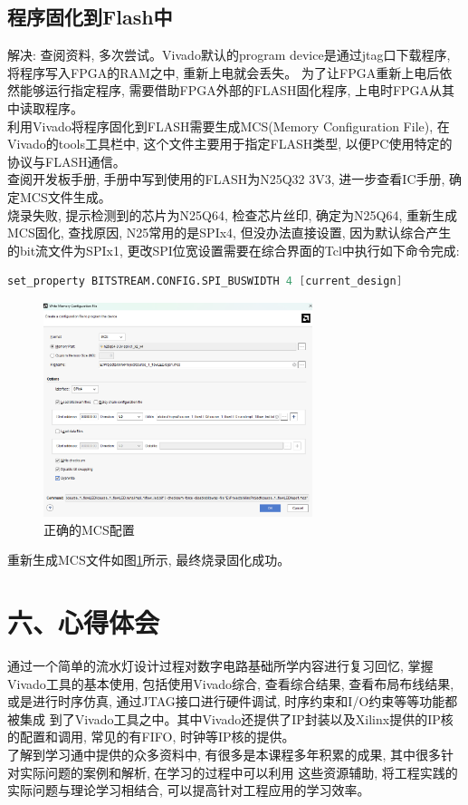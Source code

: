 \documentclass{article}
\newcommand{\fourhao}{\fontsize{14pt}{\baselineskip}\selectfont} %
\newcommand{\xiaosihao}{\fontsize{12pt}{\baselineskip}\selectfont} %
\begin{document}
\subsection*{程序固化到Flash中}
解决: 查阅资料, 多次尝试。Vivado默认的program device是通过jtag口下载程序, 将程序写入FPGA的RAM之中, 重新上电就会丢失。
为了让FPGA重新上电后依然能够运行指定程序, 需要借助FPGA外部的FLASH固化程序, 上电时FPGA从其中读取程序。\\

利用Vivado将程序固化到FLASH需要生成MCS(Memory Configuration File), 在Vivado的tools工具栏中, 
这个文件主要用于指定FLASH类型, 以便PC使用特定的协议与FLASH通信。\\

查阅开发板手册, 手册中写到使用的FLASH为N25Q32 3V3, 进一步查看IC手册, 确定MCS文件生成。\\

烧录失败, 提示检测到的芯片为N25Q64, 检查芯片丝印, 确定为N25Q64,
重新生成MCS固化, 查找原因, N25常用的是SPIx4, 但没办法直接设置, 
因为默认综合产生的bit流文件为SPIx1, 更改SPI位宽设置需要在综合界面的Tcl中执行如下命令完成:
\begin{lstlisting}[language=Verilog]
set_property BITSTREAM.CONFIG.SPI_BUSWIDTH 4 [current_design]
\end{lstlisting}
\begin{figure}[htbp]
    \centering
    \includegraphics[width=0.7\textwidth]{image/2024-06-30-17-51-50.png}
    \caption{正确的MCS配置}
    \label{image_QA_1}
\end{figure}
重新生成MCS文件如图\ref{image_QA_1}所示, 最终烧录固化成功。
\section*{\fourhao 六、心得体会}
\xiaosihao
通过一个简单的流水灯设计过程对数字电路基础所学内容进行复习回忆, 掌握Vivado工具的基本使用, 包括使用Vivado综合,
查看综合结果, 查看布局布线结果, 或是进行时序仿真, 通过JTAG接口进行硬件调试, 时序约束和I/O约束等等功能都被集成
到了Vivado工具之中。其中Vivado还提供了IP封装以及Xilinx提供的IP核的配置和调用, 常见的有FIFO, 时钟等IP核的提供。\\

了解到学习通中提供的众多资料中, 有很多是本课程多年积累的成果, 其中很多针对实际问题的案例和解析, 在学习的过程中可以利用
这些资源辅助, 将工程实践的实际问题与理论学习相结合, 可以提高针对工程应用的学习效率。
\end{document}
